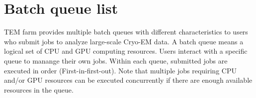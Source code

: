 \documentclass[letterpaper,10pt,english]{sphinxmanual}
\begin{document}
\section{Batch queue list}
\label{\detokenize{queue:batch-queue-list}}
TEM farm provides multiple batch queues with different characteristics to users who submit jobs to analyze large-scale Cryo-EM data.
A batch queue means a logical set of CPU and GPU computing resources.
Users interact with a specific queue to manange their own jobs.
Within each queue, submitted jobs are executed in order (First-in-first-out).
Note that multiple jobs requiring CPU and/or GPU resources can be executed concurrently if there are enough available resources in the queue.

\end{document}
